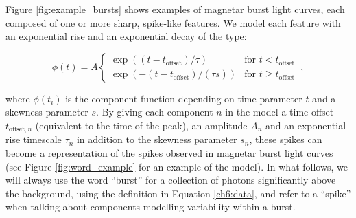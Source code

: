 \documentclass[12pt]{emulateapj}
\newcommand{\word}{\phi}
\begin{document}
Figure \ref{fig:example_bursts} shows examples of magnetar burst light curves, each composed of one or more sharp, spike-like features.
We model each feature with an exponential rise and an exponential decay of the type:



\begin{equation}
\word(t) = A \left\{\begin{array}{ll}\exp((t-t_{\mathrm{offset}})/\tau) & \mbox{for $t < t_{\mathrm{offset}}$}\\ 
\exp(-(t-t_{\mathrm{offset}})/(\tau s)) & \mbox{for $t \geq t_\mathrm{offset}$}\end{array}\right. \, ,
\label{eqn:word}
\end{equation}

where $\word(t_i)$ is the component function depending on time parameter $t$ and a skewness
parameter $s$. By giving each component $n$ in the model a time offset $t_{\mathrm{offset},n}$ (equivalent to the time of the peak), 
an amplitude $A_n$ and an exponential rise timescale $\tau_n$ in addition to the skewness parameter $s_n$, 
these spikes can become a representation of the spikes observed in magnetar burst light curves (see Figure \ref{fig:word_example}
for an example of the model). In what follows, we will always use the word ``burst'' for a collection of photons significantly above the background,
using the definition in Equation \ref{ch6:data}, and refer to a ``spike'' when talking about components modelling variability within a burst. 
\end{document}
